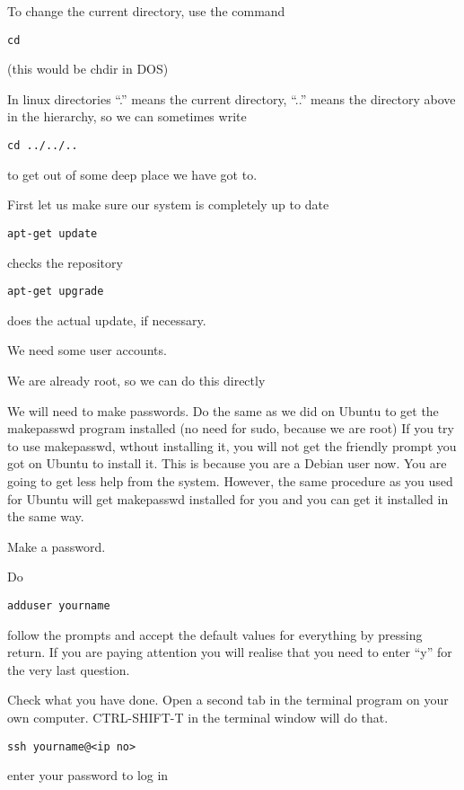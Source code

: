 \documentclass[12pt,a4paper]{article}
\begin{document}
To change the current directory, use the command 
\begin{verbatim}
cd
\end{verbatim}
(this would be chdir in DOS)

In linux directories “.” means the current directory, “..” means the directory above in the hierarchy, so we can sometimes write
\begin{verbatim}
cd ../../..
\end{verbatim}

to get out of some deep place we have got to.

First let us make sure our system is completely up to date
\begin{verbatim}
apt-get update
\end{verbatim}
checks the repository
\begin{verbatim}
apt-get upgrade
\end{verbatim}
does the actual update, if necessary.

We need some user accounts.

We are already root, so we can do this directly

We will need to make passwords. Do the same as we did on Ubuntu to get the makepasswd program installed (no need for sudo, because we are root)
If you try to use makepasswd, wthout installing it, you will not get the friendly prompt you got on Ubuntu to install it. This is because you are a Debian user now.  You are going to get less help from the system. However, the same procedure as you used for Ubuntu will get makepasswd installed for you and you can get it installed in the same way.

Make a password.

Do
\begin{verbatim}
adduser yourname
\end{verbatim}

follow the prompts and accept the default values for everything by pressing return. If you are paying attention you will realise that you need to enter “y” for the very last question.

Check what you have done. Open a second tab in the terminal program on your own computer. CTRL-SHIFT-T in the terminal window will do that.
\begin{verbatim}
ssh yourname@<ip no>
\end{verbatim}
enter your password to log in
\end{document}

